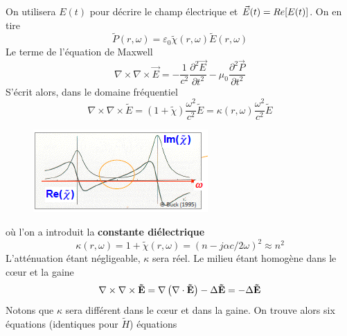 On utilisera $E(t)$ pour décrire le champ électrique et $\vec{E}{\rm{(}}t{\rm{)}} = Re{\rm{[}}E{\rm{(}}t{\rm{)]}}$. On en tire
\begin{equation}
\tilde P\left( {r,\omega } \right) = {\varepsilon _0}\tilde \chi \left( {r,\omega } \right)\tilde E\left( {r,\omega } \right)
\end{equation}
Le terme de l'équation de Maxwell
\begin{equation}
\nabla  \times \nabla  \times \vec{E} =  - \frac{1}{{{c^2}}}\frac{{{\partial ^2}\vec{E}}}{{\partial {t^2}}} - {\mu _0}\frac{{{\partial ^2}\vec{P}}}{{\partial {t^2}}}
\end{equation}
S'écrit alors, dans le domaine fréquentiel
\begin{equation}
\nabla  \times \nabla  \times \tilde E = \left( {1 + \tilde \chi } \right)\frac{{{\omega ^2}}}{{{c^2}}}\tilde E = \kappa \left( {r,\omega } \right)\frac{{{\omega ^2}}}{{{c^2}}}\tilde E
\end{equation}


\begin{figure}
	\vspace{-5mm}
	\includegraphics[scale=0.8]{ch1/image11}
	\end{figure}
où l'on a introduit la \textbf{constante diélectrique}
\begin{equation}
\kappa \left( {r,\omega } \right) = 1 + \tilde \chi \left( {r,\omega } \right) = {(n - j\alpha c/2\omega )^2} \approx {n^2}
\end{equation}
L'atténuation étant négligeable, $\kappa$ sera réel. Le milieu étant homogène dans le
cœur et la gaine
\begin{equation}
\nabla  \times \nabla  \times {\bf{\tilde E}} = \nabla \left( {\nabla  \cdot {\bf{\tilde E}}} \right) - \Delta {\bf{\tilde E}} =  - \Delta {\bf{\tilde E}}
\end{equation}
Notons que $\kappa$ sera différent dans le cœur et dans la gaine. On trouve alors six équations (identiques pour $\tilde{H}$) équations\\

